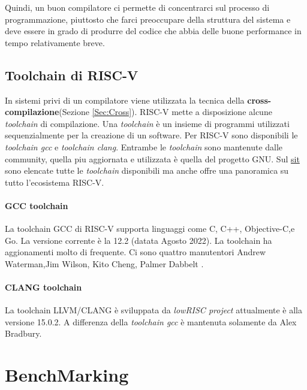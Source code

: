 \documentclass[12pt,a4paper]{report}
\begin{document}
Quindi, un buon compilatore ci permette di concentrarci sul processo di programmazione,  piuttosto che farci preoccupare della struttura del sistema e deve essere in grado di produrre del codice che abbia delle buone performance in tempo relativamente breve.


\section{Toolchain di RISC-V}
In sistemi privi di un compilatore viene utilizzata la tecnica della \textbf{cross-compilazione}(Sezione \ref{Sec:Cross}).  RISC-V mette a disposizione alcune \textit{toolchain} di compilazione. Una \textit{toolchain} è un insieme di programmi utilizzati sequenzialmente per la creazione di un software. Per RISC-V sono disponibili le \textit{toolchain gcc}\cite{toolchain_gcc} e \textit{toolchain clang}\cite{toolchain_clang}. Entrambe le \textit{toolchain} sono mantenute dalle community, quella piu aggiornata e utilizzata è quella del progetto GNU.  Sul \href{https://wiki.riscv.org/display/HOME/RISC-V+Software+Ecosystem}{sit} sono elencate tutte le \textit{toolchain} disponibili ma anche offre una panoramica su tutto l'ecosistema RISC-V.


\subsubsection{GCC toolchain}
La toolchain GCC di RISC-V supporta linguaggi come C, C++, Objective-C,e Go. La versione corrente è la 12.2 (datata Agosto 2022).  La toolchain ha aggionamenti molto di frequente.  Ci sono quattro manutentori Andrew Waterman,Jim Wilson, Kito Cheng, Palmer Dabbelt .

\subsubsection{CLANG toolchain}
La toolchain LLVM/CLANG è sviluppata da \textit{lowRISC project} attualmente è alla versione 15.0.2. A differenza della \textit{toolchain gcc} è mantenuta solamente da Alex Bradbury.



\chapter{BenchMarking}
\end{document}
